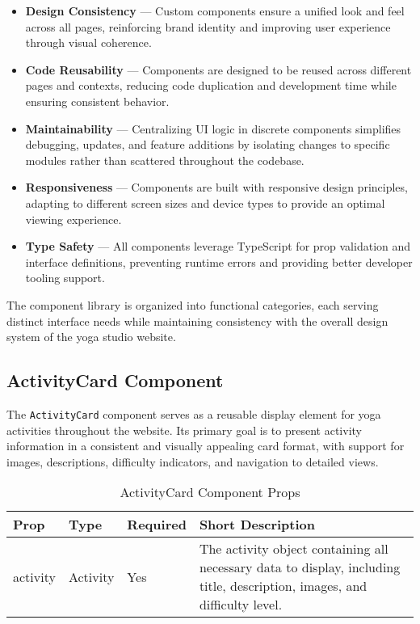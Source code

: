 \begin{itemize}
    \item \textbf{Design Consistency} --- Custom components ensure a unified look and feel across all pages, reinforcing brand identity and improving user experience through visual coherence.
    
    \item \textbf{Code Reusability} --- Components are designed to be reused across different pages and contexts, reducing code duplication and development time while ensuring consistent behavior.
    
    \item \textbf{Maintainability} --- Centralizing UI logic in discrete components simplifies debugging, updates, and feature additions by isolating changes to specific modules rather than scattered throughout the codebase.
    
    \item \textbf{Responsiveness} --- Components are built with responsive design principles, adapting to different screen sizes and device types to provide an optimal viewing experience.
    
    \item \textbf{Type Safety} --- All components leverage TypeScript for prop validation and interface definitions, preventing runtime errors and providing better developer tooling support.
\end{itemize}

The component library is organized into functional categories, each serving distinct interface needs while maintaining consistency with the overall design system of the yoga studio website.

\subsection{ActivityCard Component}
The \texttt{ActivityCard} component serves as a reusable display element for yoga activities throughout the website. Its primary goal is to present activity information in a consistent and visually appealing card format, with support for images, descriptions, difficulty indicators, and navigation to detailed views.

\begin{table}[H]
    \centering
    \setlength{\tabcolsep}{5pt}
    \renewcommand{\arraystretch}{1.2}
    \begin{tabular}{|p{2.5cm}|p{2.5cm}|p{1.8cm}|p{6.5cm}|}
        \hline
        \rowcolor{bluepoli!20}
        \textbf{Prop} & \textbf{Type} & \textbf{Required} & \textbf{Short Description} \\
        \hline
        activity & Activity & Yes & The activity object containing all necessary data to display, including title, description, images, and difficulty level. \\
        \hline
    \end{tabular}
    \caption{ActivityCard Component Props}
\end{table}


